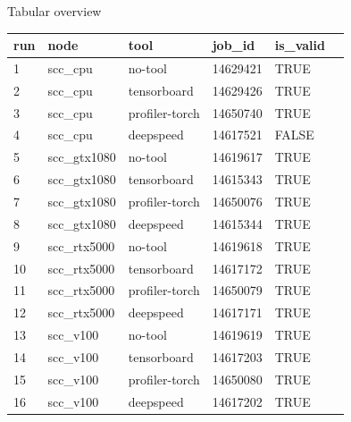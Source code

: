 \documentclass[compress,aspectratio=169]{beamer}
\begin{document}
\begin{frame}{Tabular overview}
\scriptsize{
\begin{table}[]
\begin{tabular}{@{}llllll@{}}
\toprule
run & node         & tool           & job\_id  & is\_valid  \\ \midrule
1   & scc\_cpu     & no-tool        & 14629421 & TRUE                  \\
2   & scc\_cpu     & tensorboard    & 14629426 & TRUE                  \\
3   & scc\_cpu     & profiler-torch & 14650740 & TRUE                  \\
4   & scc\_cpu     & deepspeed      & 14617521 & FALSE                 \\
5   & scc\_gtx1080 & no-tool        & 14619617 & TRUE                  \\
6   & scc\_gtx1080 & tensorboard    & 14615343 & TRUE                  \\
7   & scc\_gtx1080 & profiler-torch & 14650076 & TRUE                  \\
8   & scc\_gtx1080 & deepspeed      & 14615344 & TRUE                  \\
9   & scc\_rtx5000 & no-tool        & 14619618 & TRUE                  \\
10  & scc\_rtx5000 & tensorboard    & 14617172 & TRUE                  \\
11  & scc\_rtx5000 & profiler-torch & 14650079 & TRUE                  \\
12  & scc\_rtx5000 & deepspeed      & 14617171 & TRUE                  \\
13  & scc\_v100    & no-tool        & 14619619 & TRUE                  \\
14  & scc\_v100    & tensorboard    & 14617203 & TRUE                  \\
15  & scc\_v100    & profiler-torch & 14650080 & TRUE                  \\
16  & scc\_v100    & deepspeed      & 14617202 & TRUE                 
\end{tabular}
\end{table}
}
\end{frame}
\end{document}
